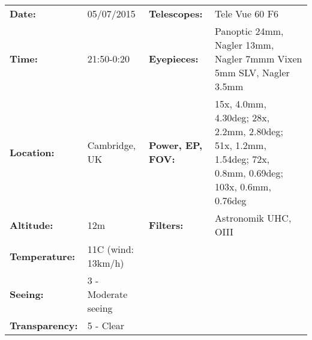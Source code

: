\begin{tabular}{ p{0.9in} p{1.3in} p{1.2in} p{5.2in}}
{\bf Date:} & 05/07/2015 & {\bf Telescopes:} & Tele Vue 60 F6 \\ 
{\bf Time:} & 21:50-0:20 & {\bf Eyepieces:} & Panoptic 24mm, Nagler 13mm, Nagler 7mmm Vixen 5mm SLV, Nagler 3.5mm \\ 
{\bf Location:} & Cambridge, UK & {\bf Power, EP, FOV:} & 15x, 4.0mm, 4.30deg; 28x, 2.2mm, 2.80deg; 51x, 1.2mm, 1.54deg; 72x, 0.8mm, 0.69deg; 103x, 0.6mm, 0.76deg \\ 
{\bf Altitude:} & 12m & {\bf Filters:} & Astronomik UHC, OIII \\ 
{\bf Temperature:} & 11C (wind: 13km/h) & & \\ 
{\bf Seeing:} & 3 - Moderate seeing & & \\ 
{\bf Transparency:} & 5 - Clear & & \\ 
\end{tabular}
\centering 
